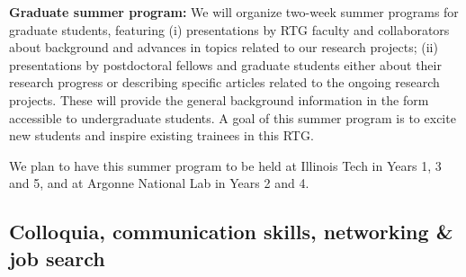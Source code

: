\documentclass[11pt]{NSFamsart}
\begin{document}
 
 
\noindent
\textbf{Graduate summer program:} We will organize two-week summer programs for  graduate students, featuring (i) presentations by RTG faculty and collaborators about background and advances  in topics related to our research  projects; (ii) presentations by postdoctoral fellows and graduate students either about their research progress or describing specific articles related to the ongoing research projects. These will provide the general background
information in the form accessible to undergraduate students.  A goal of   this summer program is to excite new students and inspire existing trainees in this RTG. 

We plan to have this summer program to be held at Illinois Tech in Years 1, 3 and 5, and at Argonne National Lab in Years 2 and 4. 


 
 



\subsection{Colloquia, communication skills, networking \& job search}
\end{document}

